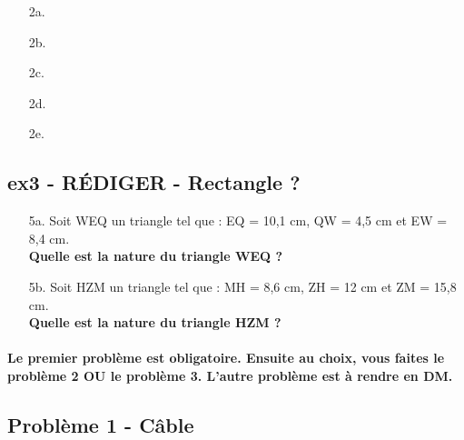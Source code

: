 \documentclass[12pt]{article}
\begin{document}
\begin{multicols}{5}
\begin{enumerate}
\item[2a.] \dotfill 
\item[2b.] \dotfill
\item[2c.] \dotfill 
\item[2d.] \dotfill 
\item[2e.] \dotfill 
\end{enumerate}
\end{multicols}
\begin{multicols}{5}
\begin{enumerate}
\item[] \dotfill 
\item[] \dotfill
\item[] \dotfill 
\item[] \dotfill 
\item[] \dotfill 
\end{enumerate}
\end{multicols}

\subsection*{ex3 - \textbf{RÉDIGER} - Rectangle ?}

\begin{enumerate}
  \item[5a.]Soit WEQ un triangle tel que : EQ = 10,1 cm, QW = 4,5 cm et EW = 8,4 cm.\\
  \textbf{Quelle est la nature du triangle WEQ ?} \\ \Pointilles[4]

  \item[5b.]Soit HZM un triangle tel que : MH = 8,6 cm, ZH = 12 cm et ZM = 15,8 cm. \\
  \textbf{Quelle est la nature du triangle HZM ?} \\ \Pointilles[4]
\end{enumerate}

\newpage

\paragraph{Le premier problème est obligatoire. Ensuite au choix, vous faites le problème 2 \textbf{OU} le problème 3. L'autre problème est à rendre en DM.}

\subsection*{Problème 1 - Câble}
\end{document}
